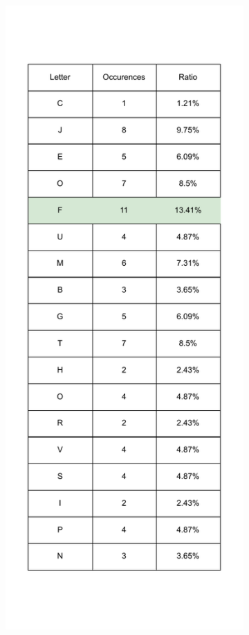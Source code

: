 \begin{figure}[htb]
  \centering
  \begin{subfigure}[t]{0.32\textwidth}
    \centering
    \includegraphics[height=0.45\textheight]{Chapters/Diagram/Crypto/seg_1.drawio.pdf}

\end{subfigure}
\end{figure}

